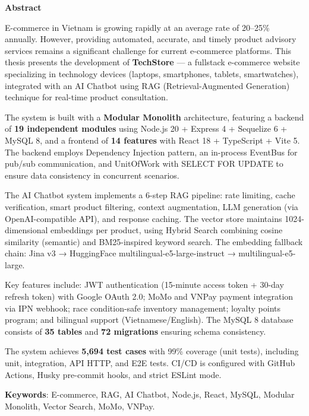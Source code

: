 \begin{center}
\textbf{\large{Abstract}}
\end{center}

\begin{small}

E-commerce in Vietnam is growing rapidly at an average rate of 20--25\% annually. However, providing automated, accurate, and timely product advisory services remains a significant challenge for current e-commerce platforms. This thesis presents the development of \textbf{TechStore} --- a fullstack e-commerce website specializing in technology devices (laptops, smartphones, tablets, smartwatches), integrated with an AI Chatbot using RAG (Retrieval-Augmented Generation) technique for real-time product consultation.

The system is built with a \textbf{Modular Monolith} architecture, featuring a backend of \textbf{19 independent modules} using Node.js 20 + Express 4 + Sequelize 6 + MySQL 8, and a frontend of \textbf{14 features} with React 18 + TypeScript + Vite 5. The backend employs Dependency Injection pattern, an in-process EventBus for pub/sub communication, and UnitOfWork with SELECT FOR UPDATE to ensure data consistency in concurrent scenarios.

The AI Chatbot system implements a 6-step RAG pipeline: rate limiting, cache verification, smart product filtering, context augmentation, LLM generation (via OpenAI-compatible API), and response caching. The vector store maintains 1024-dimensional embeddings per product, using Hybrid Search combining cosine similarity (semantic) and BM25-inspired keyword search. The embedding fallback chain: Jina v3 → HuggingFace multilingual-e5-large-instruct → multilingual-e5-large.

Key features include: JWT authentication (15-minute access token + 30-day refresh token) with Google OAuth 2.0; MoMo and VNPay payment integration via IPN webhook; race condition-safe inventory management; loyalty points program; and bilingual support (Vietnamese/English). The MySQL 8 database consists of \textbf{35 tables} and \textbf{72 migrations} ensuring schema consistency.

The system achieves \textbf{5,694 test cases} with 99\% coverage (unit tests), including unit, integration, API HTTP, and E2E tests. CI/CD is configured with GitHub Actions, Husky pre-commit hooks, and strict ESLint mode.

\vspace*{0.5cm}
\textbf{Keywords}: E-commerce, RAG, AI Chatbot, Node.js, React, MySQL, Modular Monolith, Vector Search, MoMo, VNPay.

\end{small}
